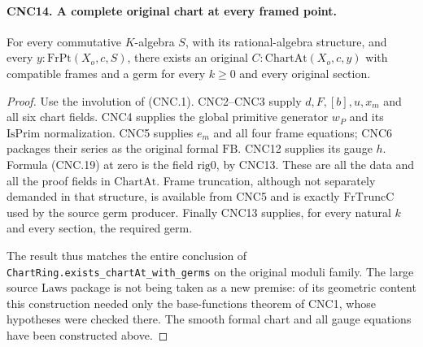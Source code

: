 \documentclass[11pt,a4paper]{article}
\numberwithin{equation}{section}
\theoremstyle{remark}\newtheorem{remark}[theorem]{Remark}
\begin{document}
\paragraph{CNC14. A complete original chart at every framed point.}
\label{claim:CNC14}
For every commutative \(K\)-algebra \(S\), with its rational-algebra
structure, and every \(y:\mathrm{FrPt}(X_o,c,S)\), there exists
an original \(C:\mathrm{ChartAt}(X_o,c,y)\) with compatible frames
and a germ for every \(k\geq0\) and every original section.
\begin{proof}
Use the involution of (CNC.1).  CNC2--CNC3 supply
\(d,F,[b],u,x_m\) and all six chart fields.  CNC4 supplies the
global primitive generator \(w_P\) and its \(\mathrm{IsPrim}\)
normalization.  CNC5 supplies \(e_m\) and all four frame equations;
CNC6 packages their series as the original formal \(\mathrm{FB}\).
CNC12 supplies its gauge \(h\).  Formula (CNC.19) at zero is the
field \(\mathrm{rig0}\), by CNC13.  These are all the data and
all the proof fields in \(\mathrm{ChartAt}\).  Frame truncation,
although not separately demanded in that structure, is available from
CNC5 and is exactly \(\mathrm{FrTruncC}\) used by the source
germ producer.  Finally CNC13 supplies, for every natural \(k\) and
every section, the required germ.

The result thus matches the entire conclusion of
\texttt{Chart\allowbreak Ring.\allowbreak exists\_\allowbreak chart\allowbreak At\_\allowbreak with\_\allowbreak germs} on the original
moduli family.  The large source \(\mathrm{Laws}\) package is not
being taken as a new premise: of its geometric content this construction
needed only the base-functions theorem of CNC1, whose hypotheses were
checked there.  The smooth formal chart and all gauge equations have
been constructed above.
\end{proof}

\end{document}
